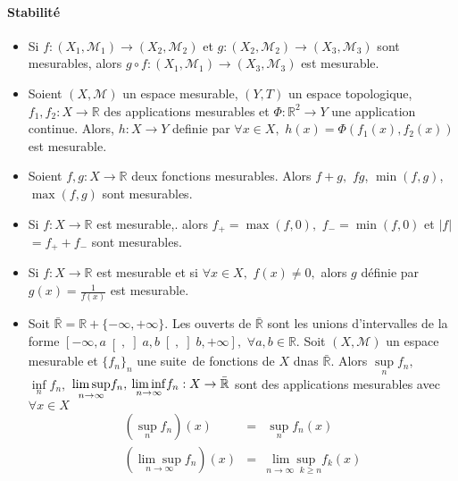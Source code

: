 \documentclass[3pt]{article}
\begin{document}
\paragraph{Stabilit\'{e}}

\bigskip

\begin{itemize}
\item Si $f:(X_{1},\mathcal{M}_{1})\rightarrow (X_{2},\mathcal{M}_{2})$ et $%
g:(X_{2},\mathcal{M}_{2})\rightarrow (X_{3},\mathcal{M}_{3})$ sont
mesurables, alors $g\circ f:(X_{1},\mathcal{M}_{1})\rightarrow (X_{3},%
\mathcal{M}_{3})$ est mesurable.

\item Soient $(X,\mathcal{M})$ un espace mesurable, $(Y,T)$ un espace
topologique, $f_{1},f_{2}:X\rightarrow \mathbb{R}$ des applications
mesurables et $\Phi :\mathbb{R}^{2}\rightarrow Y$ une application continue.
Alors, $h:X\rightarrow Y$ definie par $\forall x\in X,$ $h(x)=\Phi
(f_{1}(x),f_{2}(x))$ est mesurable.

\item Soient $f,g:X\rightarrow \mathbb{R}$ deux fonctions mesurables. Alors $%
f+g,$ $fg$, $\min (f,g)$, $\max (f,g)$ sont mesurables.

\item Si $f:X\rightarrow \mathbb{R}$ est mesurable,. alors $f_{+}=\max
(f,0), $ $f_{-}=\min (f,0)$ et $|f|$ $=f_{+}+f_{-}$ sont mesurables.

\item Si $f:X\rightarrow \mathbb{R}$ est mesurable et si $\forall x\in X,$ $%
f(x)\neq 0,$ alors $g$ d\'{e}finie par $g(x)=\frac{1}{f(x)}$ est mesurable.

\item Soit $\mathbb{\bar{R}}=\mathbb{R}+\{-\infty ,+\infty \}.$ Les ouverts
de $\mathbb{\bar{R}}$ sont les unions d'intervalles de la forme $\left[
-\infty ,a\right[ ,\left] a,b\right[ ,\left] b,+\infty \right] ,$ $\forall
a,b\in \mathbb{R}.$ Soit $(X,\mathcal{M})$ un espace mesurable et $%
\{f_{n}\}_{n}$ une suite\ de fonctions de $X$ dnas $\mathbb{\bar{R}}$. Alors 
$\underset{n}{\sup }f_{n},$ $\underset{n}{\inf }f_{n},$ $\underset{%
n\rightarrow \infty }{\lim \sup }f_{n},$ $\underset{n\rightarrow \infty }{%
\lim \inf }f_{n}:X\rightarrow \mathbb{\bar{R}}$ sont des applications
mesurables avec $\forall x\in X$%
\begin{eqnarray*}
\left( \underset{n}{\sup }f_{n}\right) (x) &=&\underset{n}{\sup }f_{n}(x) \\
\left( \underset{n\rightarrow \infty }{\lim \sup }f_{n}\right) (x) &=&%
\underset{n\rightarrow \infty \text{ }k\geq n}{\lim \sup }f_{k}(x)
\end{eqnarray*}
\end{itemize}
\end{document}
